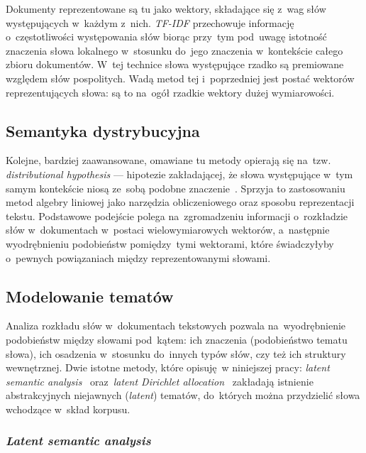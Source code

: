 \documentclass[pl]{minipw} %
\begin{document}
Dokumenty reprezentowane są tu jako wektory, składające się z~wag słów występujących w~każdym z~nich. \textit{TF-IDF} przechowuje informację o~częstotliwości występowania słów biorąc przy~tym pod~uwagę istotność znaczenia słowa lokalnego w~stosunku do~jego znaczenia w~kontekście całego zbioru dokumentów. W~tej technice słowa występujące rzadko są premiowane względem słów pospolitych. Wadą metod tej i~poprzedniej jest postać wektorów reprezentujących słowa: są to na~ogół rzadkie wektory dużej wymiarowości.

\subsection{Semantyka dystrybucyjna}

Kolejne, bardziej zaawansowane, omawiane tu metody opierają się na~tzw. \textit{distributional hypothesis} --- hipotezie zakładającej, że słowa występujące w~tym samym kontekście niosą ze~sobą podobne znaczenie~\cite{bow}\cite{firth}. Sprzyja to zastosowaniu metod algebry liniowej jako narzędzia obliczeniowego oraz sposobu reprezentacji tekstu. Podstawowe podejście polega na~zgromadzeniu informacji o~rozkładzie słów w~dokumentach w~postaci wielowymiarowych wektorów, a~następnie wyodrębnieniu podobieństw pomiędzy~tymi wektorami, które świadczyłyby o~pewnych powiązaniach między reprezentowanymi słowami.

\subsection{Modelowanie tematów}

Analiza rozkładu słów w~dokumentach tekstowych pozwala na~wyodrębnienie podobieństw między słowami pod~kątem: ich znaczenia (podobieństwo tematu słowa), ich osadzenia w~stosunku do~innych typów słów, czy też ich struktury wewnętrznej. Dwie istotne metody, które opisuję~w niniejszej pracy: \textit{latent semantic analysis}~\cite{lsa} oraz~\textit{latent Dirichlet allocation}~\cite{lda} zakładają istnienie abstrakcyjnych niejawnych (\textit{latent}) tematów, do~których można przydzielić słowa wchodzące w~skład korpusu.

\subsubsection{\textit{Latent semantic analysis}}
\end{document}

